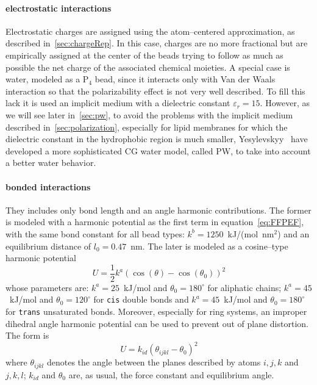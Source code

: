 
\paragraph{\textbf{electrostatic interactions}} Electrostatic charges are assigned using the atom--centered approximation, as described in~\ref{sec:chargeRep}. In this case, charges are no more fractional but are empirically assigned at the center of the beads trying to follow as much as possible the net charge of the associated chemical moieties. A special case is water, modeled as a P$_4$ bead, since it interacts only with Van der Waals interaction so that the polarizability effect is not very well described. To fill this lack it is used an implicit medium with a dielectric constant $\varepsilon_r = 15$. However, as we will see later in~\ref{sec:pw}, to avoid the problems with the implicit medium described in~\ref{sec:polarization}, especially for lipid membranes for which the dielectric constant in the hydrophobic region is much smaller, Yesylevskyy \etal\, \cite{PW} have developed a more sophisticated \ac{CG} water model, called \ac{PW}, to take into account a better water behavior.

\paragraph{\textbf{bonded interactions}} They includes only bond length and an angle harmonic contributions. The former is modeled with a harmonic potential as the first term in equation~\eqref{eq:FFPEF}, with the same bond constant for all bead types: $k^b = 1250$~kJ/(mol\ nm$^2$) and an equilibrium distance of $l_0 = 0.47$~nm. The later is modeled as a cosine--type harmonic potential
\begin{equation*}
	U = \frac{1}{2}k^a (\cos(\theta) - \cos(\theta_0))^2
\end{equation*}
whose parameters are: $k^a = 25$~kJ/mol and $\theta_0 = 180^\circ$ for aliphatic chains; $k^a = 45$~kJ/mol and $\theta_0 = 120^\circ$ for \texttt{cis} double bonds and $k^a = 45$~kJ/mol and $\theta_0 = 180^\circ$ for \texttt{trans} unsaturated bonds. Moreover, especially for ring systems, an improper dihedral angle harmonic potential can be used to prevent out of plane distortion. The form is
\begin{equation*}
	U = k_{id} (\theta_{ijkl} - \theta_0)^2
\end{equation*}
where $\theta_{ijkl}$ denotes the angle between the planes described by atoms $i,j,k$ and $j,k,l$; $k_{id}$ and $\theta_0$ are, as usual, the force constant and equilibrium angle.

